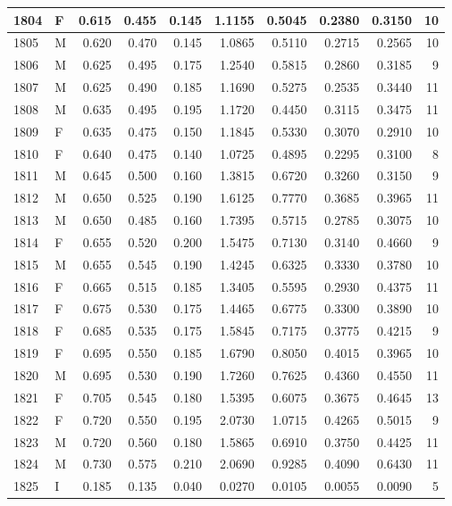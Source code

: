 \documentclass[9pt,twocolumn,twoside,]{pnas-new}
\begin{document}
\begin{tabular}{l|l|r|r|r|r|r|r|r|r}
\hline
1804 & F & 0.615 & 0.455 & 0.145 & 1.1155 & 0.5045 & 0.2380 & 0.3150 & 10\\
\hline
1805 & M & 0.620 & 0.470 & 0.145 & 1.0865 & 0.5110 & 0.2715 & 0.2565 & 10\\
\hline
1806 & M & 0.625 & 0.495 & 0.175 & 1.2540 & 0.5815 & 0.2860 & 0.3185 & 9\\
\hline
1807 & M & 0.625 & 0.490 & 0.185 & 1.1690 & 0.5275 & 0.2535 & 0.3440 & 11\\
\hline
1808 & M & 0.635 & 0.495 & 0.195 & 1.1720 & 0.4450 & 0.3115 & 0.3475 & 11\\
\hline
1809 & F & 0.635 & 0.475 & 0.150 & 1.1845 & 0.5330 & 0.3070 & 0.2910 & 10\\
\hline
1810 & F & 0.640 & 0.475 & 0.140 & 1.0725 & 0.4895 & 0.2295 & 0.3100 & 8\\
\hline
1811 & M & 0.645 & 0.500 & 0.160 & 1.3815 & 0.6720 & 0.3260 & 0.3150 & 9\\
\hline
1812 & M & 0.650 & 0.525 & 0.190 & 1.6125 & 0.7770 & 0.3685 & 0.3965 & 11\\
\hline
1813 & M & 0.650 & 0.485 & 0.160 & 1.7395 & 0.5715 & 0.2785 & 0.3075 & 10\\
\hline
1814 & F & 0.655 & 0.520 & 0.200 & 1.5475 & 0.7130 & 0.3140 & 0.4660 & 9\\
\hline
1815 & M & 0.655 & 0.545 & 0.190 & 1.4245 & 0.6325 & 0.3330 & 0.3780 & 10\\
\hline
1816 & F & 0.665 & 0.515 & 0.185 & 1.3405 & 0.5595 & 0.2930 & 0.4375 & 11\\
\hline
1817 & F & 0.675 & 0.530 & 0.175 & 1.4465 & 0.6775 & 0.3300 & 0.3890 & 10\\
\hline
1818 & F & 0.685 & 0.535 & 0.175 & 1.5845 & 0.7175 & 0.3775 & 0.4215 & 9\\
\hline
1819 & F & 0.695 & 0.550 & 0.185 & 1.6790 & 0.8050 & 0.4015 & 0.3965 & 10\\
\hline
1820 & M & 0.695 & 0.530 & 0.190 & 1.7260 & 0.7625 & 0.4360 & 0.4550 & 11\\
\hline
1821 & F & 0.705 & 0.545 & 0.180 & 1.5395 & 0.6075 & 0.3675 & 0.4645 & 13\\
\hline
1822 & F & 0.720 & 0.550 & 0.195 & 2.0730 & 1.0715 & 0.4265 & 0.5015 & 9\\
\hline
1823 & M & 0.720 & 0.560 & 0.180 & 1.5865 & 0.6910 & 0.3750 & 0.4425 & 11\\
\hline
1824 & M & 0.730 & 0.575 & 0.210 & 2.0690 & 0.9285 & 0.4090 & 0.6430 & 11\\
\hline
1825 & I & 0.185 & 0.135 & 0.040 & 0.0270 & 0.0105 & 0.0055 & 0.0090 & 5\\

\end{tabular}
\end{document}
